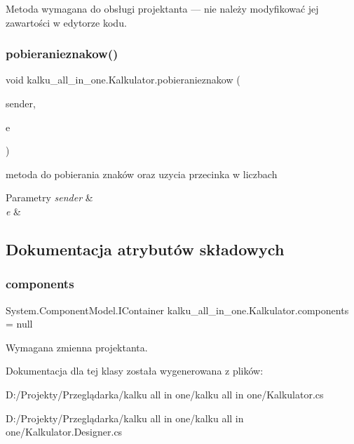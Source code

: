 Metoda wymagana do obsługi projektanta — nie należy modyfikować jej zawartości w edytorze kodu. 

\mbox{\label{classkalku__all__in__one_1_1_kalkulator_a3243bcd8324a673e6e5dfc012b057709}} 
\subsubsection{\texorpdfstring{pobieranieznakow()}{pobieranieznakow()}}
{\footnotesize\ttfamily void kalku\+\_\+all\+\_\+in\+\_\+one.\+Kalkulator.\+pobieranieznakow (\begin{DoxyParamCaption}\item[{object}]{sender,  }\item[{Event\+Args}]{e }\end{DoxyParamCaption})}



metoda do pobierania znaków oraz uzycia przecinka w liczbach 


\begin{DoxyParams}{Parametry}
{\em sender} & \\
\hline
{\em e} & \\
\hline
\end{DoxyParams}


\subsection{Dokumentacja atrybutów składowych}
\mbox{\label{classkalku__all__in__one_1_1_kalkulator_a1715a33d70720ecdb66997bc7f5705ff}} 
\subsubsection{\texorpdfstring{components}{components}}
{\footnotesize\ttfamily System.\+Component\+Model.\+I\+Container kalku\+\_\+all\+\_\+in\+\_\+one.\+Kalkulator.\+components = null\hspace{0.3cm}{\ttfamily [private]}}



Wymagana zmienna projektanta. 



Dokumentacja dla tej klasy została wygenerowana z plików\+:\begin{DoxyCompactItemize}
\item 
D\+:/\+Projekty/\+Przeglądarka/kalku all in one/kalku all in one/Kalkulator.\+cs\item 
D\+:/\+Projekty/\+Przeglądarka/kalku all in one/kalku all in one/Kalkulator.\+Designer.\+cs\end{DoxyCompactItemize}
